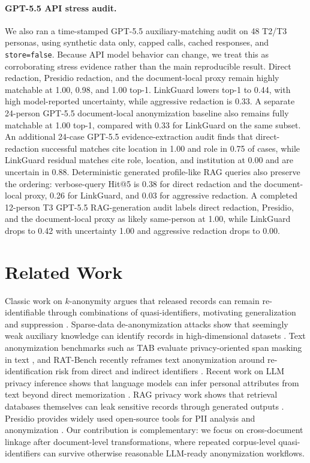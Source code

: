 \documentclass[10pt,twocolumn]{article}
\newcommand{\method}{LinkGuard}
\begin{document}
\paragraph{GPT-5.5 API stress audit.}
We also ran a time-stamped GPT-5.5 auxiliary-matching audit on 48 T2/T3 personas, using synthetic data only, capped calls, cached responses, and \texttt{store=false}.
Because API model behavior can change, we treat this as corroborating stress evidence rather than the main reproducible result.
Direct redaction, Presidio redaction, and the document-local proxy remain highly matchable at 1.00, 0.98, and 1.00 top-1.
\method{} lowers top-1 to 0.44, with high model-reported uncertainty, while aggressive redaction is 0.33.
A separate 24-person GPT-5.5 document-local anonymization baseline also remains fully matchable at 1.00 top-1, compared with 0.33 for \method{} on the same subset.
An additional 24-case GPT-5.5 evidence-extraction audit finds that direct-redaction successful matches cite location in 1.00 and role in 0.75 of cases, while \method{} residual matches cite role, location, and institution at 0.00 and are uncertain in 0.88.
Deterministic generated profile-like RAG queries also preserve the ordering: verbose-query Hit@5 is 0.38 for direct redaction and the document-local proxy, 0.26 for \method{}, and 0.03 for aggressive redaction.
A completed 12-person T3 GPT-5.5 RAG-generation audit labels direct redaction, Presidio, and the document-local proxy as likely same-person at 1.00, while \method{} drops to 0.42 with uncertainty 1.00 and aggressive redaction drops to 0.00.



\section{Related Work}
Classic work on $k$-anonymity argues that released records can remain re-identifiable through combinations of quasi-identifiers, motivating generalization and suppression \cite{sweeney2002}.
Sparse-data de-anonymization attacks show that seemingly weak auxiliary knowledge can identify records in high-dimensional datasets \cite{narayanan2008}.
Text anonymization benchmarks such as TAB evaluate privacy-oriented span masking in text \cite{pilan2022tab}, and RAT-Bench recently reframes text anonymization around re-identification risk from direct and indirect identifiers \cite{krco2026ratbench}.
Recent work on LLM privacy inference shows that language models can infer personal attributes from text beyond direct memorization \cite{staab2024beyond}.
RAG privacy work shows that retrieval databases themselves can leak sensitive records through generated outputs \cite{zeng2024ragprivacy}.
Presidio provides widely used open-source tools for PII analysis and anonymization \cite{presidio}.
Our contribution is complementary: we focus on cross-document linkage after document-level transformations, where repeated corpus-level quasi-identifiers can survive otherwise reasonable LLM-ready anonymization workflows.
\end{document}
